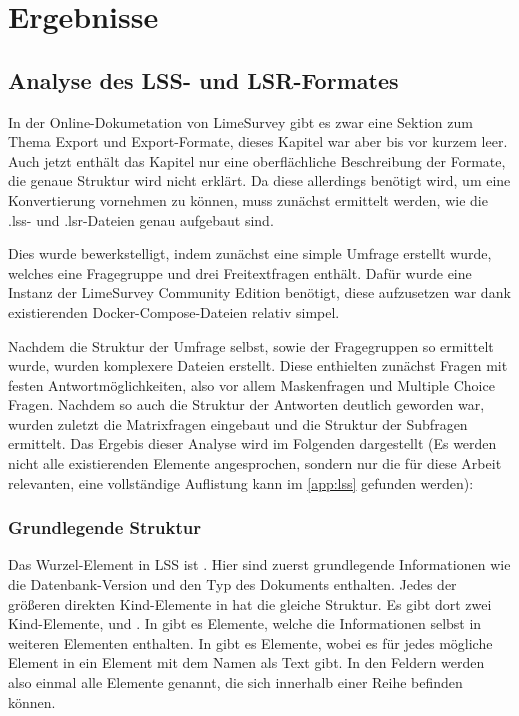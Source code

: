 \chapter{Ergebnisse}
\label{ch:ergebnisse}

\section{Analyse des LSS- und LSR-Formates}

In der Online-Dokumetation von LimeSurvey gibt es zwar eine Sektion zum Thema Export und Export-Formate, dieses Kapitel war aber bis vor kurzem leer.
Auch jetzt enthält das Kapitel nur eine oberflächliche Beschreibung der Formate, die genaue Struktur wird nicht erklärt.
Da diese allerdings benötigt wird, um eine Konvertierung vornehmen zu können, muss zunächst ermittelt werden, wie die .lss- und .lsr-Dateien genau aufgebaut sind.

Dies wurde bewerkstelligt, indem zunächst eine simple Umfrage erstellt wurde, welches eine Fragegruppe und drei Freitextfragen enthält.
Dafür wurde eine Instanz der LimeSurvey Community Edition benötigt, diese aufzusetzen war dank existierenden Docker-Compose-Dateien relativ simpel.

Nachdem die Struktur der Umfrage selbst, sowie der Fragegruppen so ermittelt wurde, wurden komplexere Dateien erstellt.
Diese enthielten zunächst Fragen mit festen Antwortmöglichkeiten, also vor allem Maskenfragen und Multiple Choice Fragen.
Nachdem so auch die Struktur der Antworten deutlich geworden war, wurden zuletzt die Matrixfragen eingebaut und die Struktur der Subfragen ermittelt.
Das Ergebis dieser Analyse wird im Folgenden dargestellt (Es werden nicht alle existierenden Elemente angesprochen, sondern nur die für diese Arbeit relevanten, eine vollständige Auflistung kann im \cref{app:lss}
gefunden werden):

\subsection{Grundlegende Struktur}

Das Wurzel-Element in LSS ist .
Hier sind zuerst grundlegende Informationen wie die Datenbank-Version und den Typ des Dokuments enthalten.
Jedes der größeren direkten Kind-Elemente in  hat die gleiche Struktur.
Es gibt dort zwei Kind-Elemente,  und . In  gibt es  Elemente, welche die Informationen selbst in weiteren Elementen enthalten.
In  gibt es  Elemente, wobei es für jedes mögliche Element in  ein  Element mit dem Namen als Text gibt.
In den Feldern werden also einmal alle Elemente genannt, die sich innerhalb einer Reihe befinden können.

